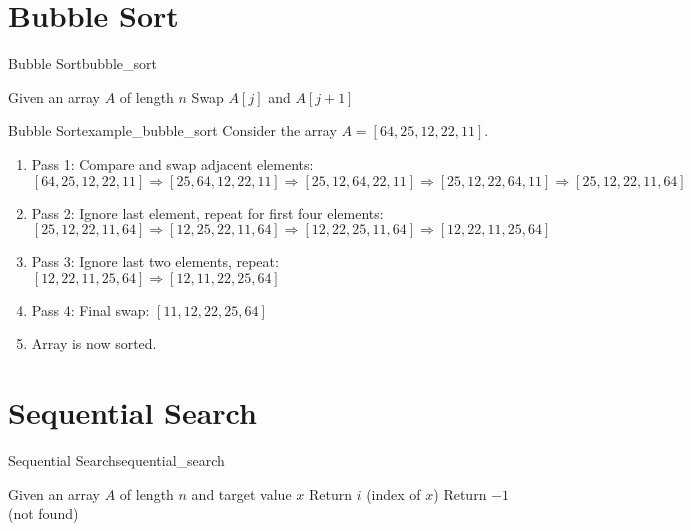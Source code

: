 \section{Bubble Sort}
\begin{algorithmtcb}
    {Bubble Sort}{bubble_sort}
    \begin{algorithmic}
        \State{} Given an array $A$ of length $n$
                    \State{} Swap $A[j]$ and $A[j+1]$
                \EndIf{}
            \EndFor{}
        \EndFor{}
    \end{algorithmic}
\end{algorithmtcb}

\begin{exampletcb}
    {Bubble Sort}{example_bubble_sort}
    Consider the array $A = [64, 25, 12, 22, 11]$.

    \begin{enumerate}
        \item Pass 1: Compare and swap adjacent elements:
            \newline $[64, 25, 12, 22, 11] \Rightarrow [25, 64, 12, 22, 11] \Rightarrow [25, 12, 64, 22, 11] \Rightarrow [25, 12, 22, 64, 11] \Rightarrow [25, 12, 22, 11, 64]$
        \item Pass 2: Ignore last element, repeat for first four elements:
            \newline $[25, 12, 22, 11, 64] \Rightarrow [12, 25, 22, 11, 64] \Rightarrow [12, 22, 25, 11, 64] \Rightarrow [12, 22, 11, 25, 64]$
        \item Pass 3: Ignore last two elements, repeat:
            \newline $[12, 22, 11, 25, 64] \Rightarrow [12, 11, 22, 25, 64]$
        \item Pass 4: Final swap:
            \newline $[11, 12, 22, 25, 64]$
        \item Array is now sorted.
    \end{enumerate}
\end{exampletcb}

\section{Sequential Search}
\begin{algorithmtcb}
    {Sequential Search}{sequential_search}
    \begin{algorithmic}
        \State{} Given an array $A$ of length $n$ and target value $x$
                \State{} Return $i$ (index of $x$)
            \EndIf{}
        \EndFor{}
        \State{} Return $-1$ (not found)
    \end{algorithmic}
\end{algorithmtcb}

